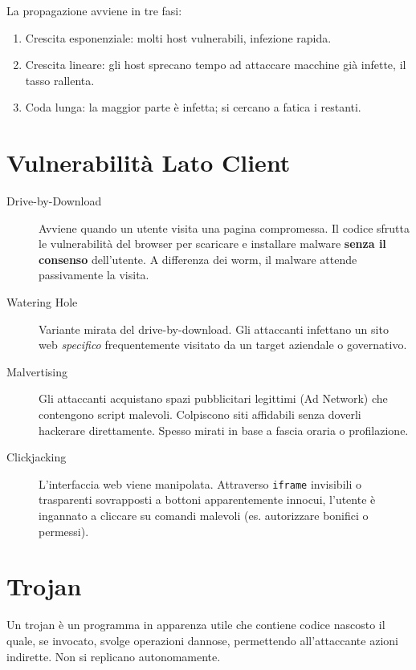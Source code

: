 \begin{notebox}
La propagazione avviene in tre fasi:
\begin{enumerate}
    \item Crescita esponenziale: molti host vulnerabili, infezione rapida.
    \item Crescita lineare: gli host sprecano tempo ad attaccare macchine già infette, il tasso rallenta.
    \item Coda lunga: la maggior parte è infetta; si cercano a fatica i restanti.
\end{enumerate}
\end{notebox}

\section{Vulnerabilità Lato Client}
\begin{description}
    \item[Drive-by-Download] Avviene quando un utente visita una pagina compromessa. Il codice sfrutta le vulnerabilità del browser per scaricare e installare malware \textbf{senza il consenso} dell'utente. A differenza dei worm, il malware attende passivamente la visita.
    \item[Watering Hole] Variante mirata del drive-by-download. Gli attaccanti infettano un sito web \textit{specifico} frequentemente visitato da un target aziendale o governativo.
    \item[Malvertising] Gli attaccanti acquistano spazi pubblicitari legittimi (Ad Network) che contengono script malevoli. Colpiscono siti affidabili senza doverli hackerare direttamente. Spesso mirati in base a fascia oraria o profilazione.
    \item[Clickjacking] L'interfaccia web viene manipolata. Attraverso \texttt{iframe} invisibili o trasparenti sovrapposti a bottoni apparentemente innocui, l'utente è ingannato a cliccare su comandi malevoli (es. autorizzare bonifici o permessi).
\end{description}

\section{Trojan}
\begin{defbox}[Trojan]
Un trojan è un programma in apparenza utile che contiene codice nascosto il quale, se invocato, svolge operazioni dannose, permettendo all'attaccante azioni indirette. Non si replicano autonomamente.
\end{defbox}

